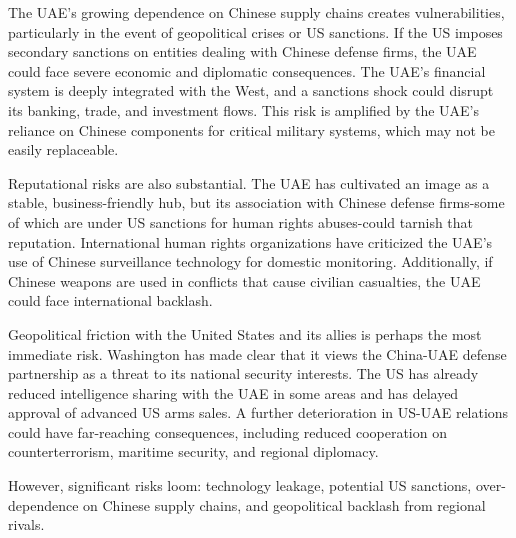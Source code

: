 \documentclass[10pt,a4paper]{article}
\begin{document}
{\small The UAE's growing dependence on Chinese supply chains creates vulnerabilities, particularly in the event of geopolitical crises or US sanctions. If the US imposes secondary sanctions on entities dealing with Chinese defense firms, the UAE could face severe economic and diplomatic consequences. The UAE's financial system is deeply integrated with the West, and a sanctions shock could disrupt its banking, trade, and investment flows. This risk is amplified by the UAE's reliance on Chinese components for critical military systems, which may not be easily replaceable.}\par
{\small Reputational risks are also substantial. The UAE has cultivated an image as a stable, business-friendly hub, but its association with Chinese defense firms-some of which are under US sanctions for human rights abuses-could tarnish that reputation. International human rights organizations have criticized the UAE's use of Chinese surveillance technology for domestic monitoring. Additionally, if Chinese weapons are used in conflicts that cause civilian casualties, the UAE could face international backlash.}\par
{\small Geopolitical friction with the United States and its allies is perhaps the most immediate risk. Washington has made clear that it views the China-UAE defense partnership as a threat to its national security interests. The US has already reduced intelligence sharing with the UAE in some areas and has delayed approval of advanced US arms sales. A further deterioration in US-UAE relations could have far-reaching consequences, including reduced cooperation on counterterrorism, maritime security, and regional diplomacy.}\par
{\small However, significant risks loom: technology leakage, potential US sanctions, over-dependence on Chinese supply chains, and geopolitical backlash from regional rivals.}\par
\label{chap:2:end}
\end{document}
